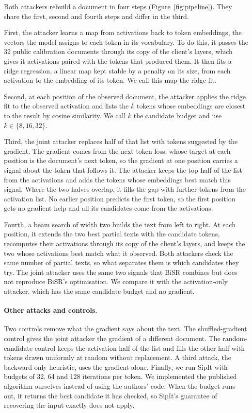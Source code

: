 \documentclass[11pt]{article}
\begin{document}
Both attackers rebuild a document in four steps (Figure~\ref{fig:pipeline}). They share the first, second and fourth steps and differ in the third.

First, the attacker learns a map from activations back to token embeddings, the vectors the model assigns to each token in its vocabulary. To do this, it passes the 32 public calibration documents through its copy of the client's layers, which gives it activations paired with the tokens that produced them. It then fits a ridge regression, a linear map kept stable by a penalty on its size, from each activation to the embedding of its token. We call this map the ridge fit.

Second, at each position of the observed document, the attacker applies the ridge fit to the observed activation and lists the $k$ tokens whose embeddings are closest to the result by cosine similarity. We call $k$ the candidate budget and use $k \in \{8, 16, 32\}$.

Third, the joint attacker replaces half of that list with tokens suggested by the gradient. The gradient comes from the next-token loss, whose target at each position is the document's next token, so the gradient at one position carries a signal about the token that follows it. The attacker keeps the top half of the list from the activations and adds the tokens whose embeddings best match this signal. Where the two halves overlap, it fills the gap with further tokens from the activation list. No earlier position predicts the first token, so the first position gets no gradient help and all its candidates come from the activations.

Fourth, a beam search of width two builds the text from left to right. At each position, it extends the two best partial texts with the candidate tokens, recomputes their activations through its copy of the client's layers, and keeps the two whose activations best match what it observed. Both attackers check the same number of partial texts, so what separates them is which candidates they try. The joint attacker uses the same two signals that BiSR combines \cite{bisr2024} but does not reproduce BiSR's optimisation. We compare it with the activation-only attacker, which has the same candidate budget and no gradient.

\paragraph{Other attacks and controls.}
Two controls remove what the gradient says about the text. The shuffled-gradient control gives the joint attacker the gradient of a different document. The random-candidate control keeps the activation half of the list and fills the other half with tokens drawn uniformly at random without replacement. A third attack, the backward-only heuristic, uses the gradient alone. Finally, we run SipIt \cite{sipit} with budgets of 32, 64 and 128 iterations per token. We implemented the published algorithm ourselves instead of using the authors' code. When the budget runs out, it returns the best candidate it has checked, so SipIt's guarantee of recovering the input exactly does not apply.
\end{document}

